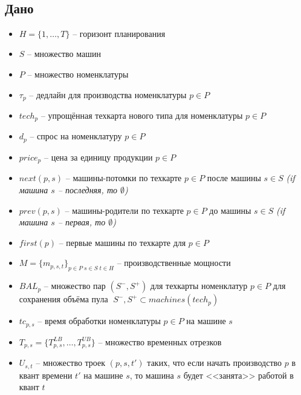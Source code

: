 \documentclass[14pt,fleqn]{extarticle}
\begin{document}
	\noindent\makebox[\linewidth]{\rule{\paperwidth}{0.4pt}}\\
	\subsection*{Дано}
	\renewcommand\labelitemi{$\vcenter{\hbox{\tiny$\bullet$}}$}
	\begin{itemize}[topsep=0pt,itemsep=-1ex,partopsep=1ex,parsep=1ex]
		\item $H = \{1, \dots, T\}$ -- горизонт планирования
		\item $S$ -- множество машин
		\item $P$ -- множество номенклатуры
		\item $\tau_p$ -- дедлайн для производства номенклатуры $p \in P$
		\item $tech_p$ -- упрощённая техкарта нового типа для номенклатуры $p \in P$
		\item $d_p$ -- спрос на номенклатуру $p\in P$
		\item $price_p$ -- цена за единицу продукции $p \in P$
		\item $next(p, s)$ -- машины-потомки по техкарте $p \in P$ после машины $s \in S$ \textit{(if машина $s$ -- последняя, то $\emptyset$)}
		\item $prev(p, s)$ -- машины-родители по техкарте $p \in P$ до машины $s \in S$ \textit{(if машина $s$ -- первая, то $\emptyset$)}
		\item $first(p)$ -- первые машины по техкарте для $p \in P$
		\item $M = \{m_{p, s, t}\}_{p \in P \; s \in S \; t \in H}$ -- производственные мощности
		\item $BAL_p$ -- множество пар $(S^{-}, S^{+})$ для техкарты номенклатур $p \in P$ для сохранения объёма пула $\; S^{-}, S^{+} \subset machines(tech_p)$
		\item $tc_{p, s}$ -- время обработки номенклатуры $p \in P$ на машине $s$
		\item $T_{p, s} = \{T_{p, s}^{LB}, \dots, T_{p, s}^{UB}\}$ -- множество временных отрезков
		\item $U_{s, t}$ -- множество троек $(p, s, t')$ таких, что если начать производство $p$ в квант времени $t'$ на машине $s$, то машина $s$ будет <<занята>> работой в квант $t$
	\end{itemize}
\end{document}

